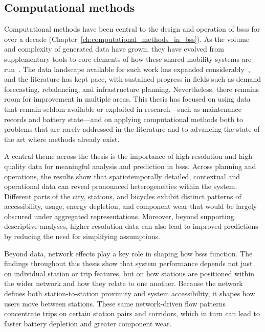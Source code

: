\subsection{Computational methods}

Computational methods have been central to the design and operation of \acp{bss} for over a decade (Chapter~\ref{ch:computational_methods_in_bss}). As the volume and complexity of generated data have grown, they have evolved from supplementary tools to core elements of how these shared mobility systems are run~\cite{FaghihImani2017, CortezOrdonez2024}. The data landscape available for such work has expanded considerably~\cite{Talavera_Garcia2021, Yanocha2018, Waldner2025}, and the literature has kept pace, with sustained progress in fields such as demand forecasting, rebalancing, and infrastructure planning. Nevertheless, there remains room for improvement in multiple areas. This thesis has focused on using data that remain seldom available or exploited in research—such as maintenance records and battery state—and on applying computational methods both to problems that are rarely addressed in the literature and to advancing the state of the art where methods already exist.

A central theme across the thesis is the importance of high-resolution and high-quality data for meaningful analysis and prediction in \acp{bss}. Across planning and operations, the results show that spatiotemporally detailed, contextual and operational data can reveal pronounced heterogeneities within the system. Different parts of the city, stations, and bicycles exhibit distinct patterns of accessibility, usage, energy depletion, and component wear that would be largely obscured under aggregated representations. Moreover, beyond supporting descriptive analyses, higher-resolution data can also lead to improved predictions by reducing the need for simplifying assumptions.

Beyond data, network effects play a key role in shaping how \acp{bss} function. The findings throughout this thesis show that system performance depends not just on individual station or trip features, but on how stations are positioned within the wider network and how they relate to one another. Because the network defines both station-to-station proximity and system accessibility, it shapes how users move between stations. These same network-driven flow patterns concentrate trips on certain station pairs and corridors, which in turn can lead to faster battery depletion and greater component wear.


